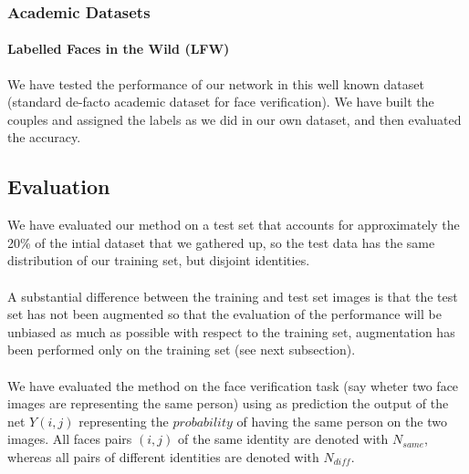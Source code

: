 
\subsubsection{Academic Datasets}
\paragraph{Labelled Faces in the Wild (LFW)}We have tested the performance of our network in this well known dataset (standard de-facto academic dataset for face verification). We have built the couples and assigned the labels as we did in our own dataset, and then evaluated the accuracy.

\subsection{Evaluation} \label{subsect:eval}
We have evaluated our method on a test set that accounts for approximately the 20\% of the intial dataset that we gathered up, so the test data has the same distribution of our training set, but disjoint identities.

\paragraph{}
A substantial difference between the training and test set images is that the test set has not been augmented so that the evaluation of the performance will be unbiased as much as possible with respect to the training set, augmentation has been performed only on the training set (see next subsection).

\paragraph{}
We have evaluated the method on the face verification task (say wheter two face images are representing the same person) using as prediction the output of the net $Y(i,j)$ representing the $probability$ of having the same person on the two images. All faces pairs $(i,j)$ of the same identity are denoted with $N_{same}$, whereas all pairs of different identities are denoted with $N_{diff}$.\\
 
